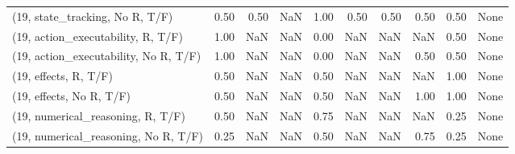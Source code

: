 \begin{table*}[h!]
\begin{adjustbox}{width=2\columnwidth,center}
\begin{tabular}{lrrr|rrr|rrr}
(19, state\_tracking, No R, T/F)       &                      0.50 &                  0.50 &                       NaN &                          1.00 &                      0.50 &                          0.50 &                                   0.50 &                               0.50 &                                  None \\
(19, action\_executability, R, T/F)    &                      1.00 &                   NaN &                       NaN &                          0.00 &                       NaN &                           NaN &                                    NaN &                               0.50 &                                  None \\
(19, action\_executability, No R, T/F) &                      1.00 &                   NaN &                       NaN &                          0.00 &                       NaN &                           NaN &                                   0.50 &                               0.50 &                                  None \\
(19, effects, R, T/F)                 &                      0.50 &                   NaN &                       NaN &                          0.50 &                       NaN &                           NaN &                                    NaN &                               1.00 &                                  None \\
(19, effects, No R, T/F)              &                      0.50 &                   NaN &                       NaN &                          0.50 &                       NaN &                           NaN &                                   1.00 &                               1.00 &                                  None \\
(19, numerical\_reasoning, R, T/F)     &                      0.50 &                   NaN &                       NaN &                          0.75 &                       NaN &                           NaN &                                    NaN &                               0.25 &                                  None \\
(19, numerical\_reasoning, No R, T/F)  &                      0.25 &                   NaN &                       NaN &                          0.50 &                       NaN &                           NaN &                                   0.75 &                               0.25 &                                  None \\

\end{tabular}
\end{adjustbox}
\end{table*}
